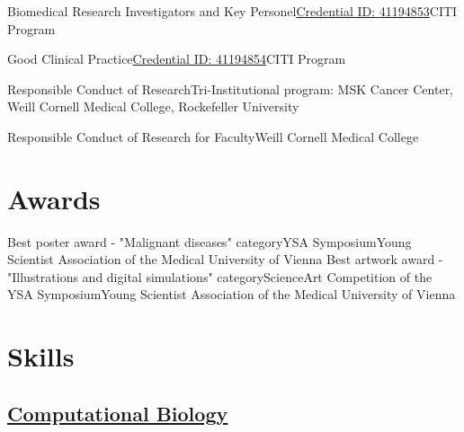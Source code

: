 \documentclass[11pt,a4paper,roman]{moderncv} %
\begin{document}
        {Biomedical Research Investigators and Key Personel}{\href{https://www.citiprogram.org/verify/?w9102e99f-9a51-41fc-993b-e50ba7dafc36-41194853}{Credential ID: 41194853}}{}{}{CITI Program}

        {Good Clinical Practice}{\href{https://www.citiprogram.org/verify/?w50fab502-7953-4e4c-ac09-87d4aa204f2f-41194854}{Credential ID: 41194854}}{}{}{CITI Program}

        {Responsible Conduct of Research}{}{}{}{Tri-Institutional program: MSK Cancer Center, Weill Cornell Medical College, Rockefeller University}

        {Responsible Conduct of Research for Faculty}{}{}{}{Weill Cornell Medical College}



\section{Awards}
        {Best poster award - "Malignant diseases" category}{YSA Symposium}{}{}{Young Scientist Association of the Medical University of Vienna}
        {Best artwork award - "Illustrations and digital simulations" category}{ScienceArt Competition of the YSA Symposium}{}{}{Young Scientist Association of the Medical University of Vienna}

\section{Skills}

\subsection{\underline{Computational Biology}}
\end{document}
